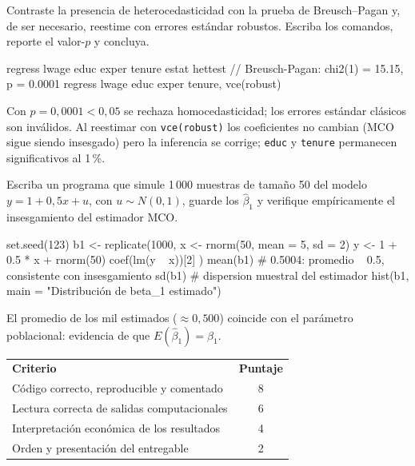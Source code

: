 \documentclass{academic-exam}
\begin{document}
\begin{ejercicio}[6][Diagnóstico]
Contraste la presencia de heterocedasticidad con la prueba de
Breusch--Pagan y, de ser necesario, reestime con errores estándar
robustos. Escriba los comandos, reporte el valor-$p$ y concluya.

\recuadrorespuesta{5cm}
\begin{solucion}
\begin{codigo}[language=Stata]
regress lwage educ exper tenure
estat hettest            // Breusch-Pagan: chi2(1) = 15.15, p = 0.0001
regress lwage educ exper tenure, vce(robust)
\end{codigo}
Con $p = 0{,}0001 < 0{,}05$ se rechaza homocedasticidad; los errores
estándar clásicos son inválidos. Al reestimar con \texttt{vce(robust)}
los coeficientes no cambian (MCO sigue siendo insesgado) pero la
inferencia se corrige; \texttt{educ} y \texttt{tenure} permanecen
significativos al 1\,\%.
\end{solucion}
\end{ejercicio}

\begin{ejercicio}[4][Simulación]
Escriba un programa que simule 1\,000 muestras de tamaño 50 del modelo
$y = 1 + 0{,}5x + u$, con $u\sim N(0,1)$, guarde los $\hat\beta_1$ y
verifique empíricamente el insesgamiento del estimador MCO.

\recuadrorespuesta{5cm}
\begin{solucion}
\begin{codigo}[language=R]
set.seed(123)
b1 <- replicate(1000, {
  x <- rnorm(50, mean = 5, sd = 2)
  y <- 1 + 0.5 * x + rnorm(50)
  coef(lm(y ~ x))[2]
})
mean(b1)   # 0.5004: promedio ~ 0.5, consistente con insesgamiento
sd(b1)     # dispersion muestral del estimador
hist(b1, main = "Distribución de beta_1 estimado")
\end{codigo}
El promedio de los mil estimados ($\approx 0{,}500$) coincide con el
parámetro poblacional: evidencia de que $E(\hat\beta_1)=\beta_1$.
\end{solucion}
\end{ejercicio}

\begin{criterios}
\begin{tabularx}{\linewidth}{@{}X c@{}}
  \textbf{Criterio} & \textbf{Puntaje}\\
  \arrayrulecolor{grislinea}\hline\addlinespace[3pt]
  Código correcto, reproducible y comentado        & 8\\
  Lectura correcta de salidas computacionales      & 6\\
  Interpretación económica de los resultados       & 4\\
  Orden y presentación del entregable              & 2\\
\end{tabularx}
\end{criterios}

\findelexamen
\end{document}
